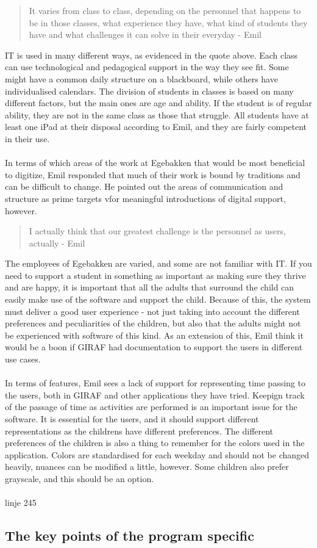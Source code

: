 \begin{quote}
    It varies from class to class, depending on the personnel that happens to be in those classes, what experience they have, what kind of students they have and what challenges it can solve in their everyday - Emil
\end{quote}
IT is used in many different ways, as evidenced in the quote above. Each class can use technological and pedagogical support in the way they see fit.
Some might have a common daily structure on a blackboard, while others have individualised calendars.
The division of students in classes is based on many different factors, but the main ones are age and ability. 
If the student is of regular ability, they are not in the same class as those that struggle.
All students have at least one iPad at their disposal according to Emil, and they are fairly competent in their use.
\\\\
In terms of which areas of the work at Egebakken that would be most beneficial to digitize, Emil responded that much of their work is bound by traditions and can be difficult to change.
He pointed out the areas of communication and structure as prime targets vfor meaningful introductions of digital support, however. 

\begin{quote}
    I actually think that our greatest challenge is the personnel as users, actually  - Emil
\end{quote}

The employees of Egebakken are varied, and some are not familiar with IT.
If you need to support a student in something as important as making sure they thrive and are happy, it is important that all the adults that surround the child can easily make use of the software and support the child.
Because of this, the system must deliver a good user experience - not just taking into account the different preferences and peculiarities of the children, but also that the adults might not be experienced with software of this kind.
As an extension of this, Emil think it would be a boon if GIRAF had documentation to support the users in different use cases.
\\\\
In terms of features, Emil sees a lack of support for representing time passing to the users, both in GIRAF and other applications they have tried.
Keepign track of the passage of time as activities are performed is an important issue for the software.
It is essential for the users, and it should support different representations as the childrens have different preferences.
The different preferences of the children is also a thing to remember for the colors used in the application.
Colors are standardised for each weekday and should not be changed heavily, nuances can be modified a little, however.
Some children also prefer grayscale, and this should be an option.
\\\\
linje 245
\subsection{The key points of the program specific}